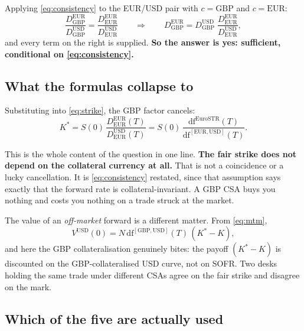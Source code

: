 \documentclass[11pt]{article}
\newcommand{\D}[2]{D_{#1}^{#2}}
\begin{document}
Applying \eqref{eq:consistency} to the EUR/USD pair with $c = \mathrm{GBP}$ and
$c = \mathrm{EUR}$:
\[
  \frac{\D{\mathrm{GBP}}{\mathrm{EUR}}}{\D{\mathrm{GBP}}{\mathrm{USD}}}
  = \frac{\D{\mathrm{EUR}}{\mathrm{EUR}}}{\D{\mathrm{EUR}}{\mathrm{USD}}}
  \qquad\Longrightarrow\qquad
  \D{\mathrm{GBP}}{\mathrm{EUR}}
  = \D{\mathrm{GBP}}{\mathrm{USD}}\;
    \frac{\D{\mathrm{EUR}}{\mathrm{EUR}}}{\D{\mathrm{EUR}}{\mathrm{USD}}},
\]
and every term on the right is supplied. \textbf{So the answer is yes: sufficient,
conditional on \eqref{eq:consistency}.}

\subsection{What the formulas collapse to}

Substituting into \eqref{eq:strike}, the GBP factor cancels:
\begin{equation}
  K^\ast
  = S(0)\,\frac{\D{\mathrm{EUR}}{\mathrm{EUR}}(T)}{\D{\mathrm{EUR}}{\mathrm{USD}}(T)}
  = S(0)\,
  \frac{\mathrm{df}^{\mathrm{EuroSTR}}(T)}{\mathrm{df}^{[\mathrm{EUR},\mathrm{USD}]}(T)} .
  \label{eq:strike_final}
\end{equation}

This is the whole content of the question in one line. \textbf{The fair strike does not
depend on the collateral currency at all.} That is not a coincidence or a lucky
cancellation. It is \eqref{eq:consistency} restated, since that assumption says exactly
that the forward rate is collateral-invariant. A GBP CSA buys you nothing and costs you
nothing on a trade struck at the market.

The value of an \emph{off-market} forward is a different matter. From \eqref{eq:mtm},
\begin{equation}
  V^{\mathrm{USD}}(0)
  = N\,\mathrm{df}^{[\mathrm{GBP},\mathrm{USD}]}(T)\,(K^\ast - K),
  \label{eq:mtm_final}
\end{equation}
and here the GBP collateralisation genuinely bites: the payoff $(K^\ast - K)$ is discounted
on the GBP-collateralised USD curve, not on SOFR. Two desks holding the same trade under
different CSAs agree on the fair strike and disagree on the mark.

\subsection{Which of the five are actually used}
\end{document}
